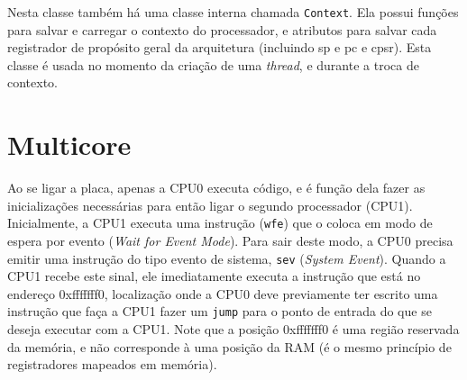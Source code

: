 Nesta classe também há uma classe interna chamada \verb+Context+. Ela possui funções para salvar e carregar o contexto do processador, e atributos para salvar cada registrador de propósito geral da arquitetura (incluindo sp e pc e cpsr). Esta classe é usada no momento da criação de uma \emph{thread}, e durante a troca de contexto.




\section{Multicore}

Ao se ligar a placa, apenas a CPU0 executa código, e é função dela fazer as inicializações necessárias para então ligar o segundo processador (CPU1). Inicialmente, a CPU1 executa uma instrução (\verb+wfe+) que o coloca em modo de espera por evento (\emph{Wait for Event Mode}). Para sair deste modo, a CPU0 precisa emitir uma instrução do tipo evento de sistema, \verb+sev+ (\emph{System Event}). Quando a CPU1 recebe este sinal, ele imediatamente executa a instrução que está no endereço 0xfffffff0, localização onde a CPU0 deve previamente ter escrito uma instrução que faça a CPU1 fazer um \verb+jump+ para o ponto de entrada do que se deseja executar com a CPU1. Note que a posição 0xfffffff0 é uma região reservada da memória, e não corresponde à uma posição da RAM (é o mesmo princípio de registradores mapeados em memória).

